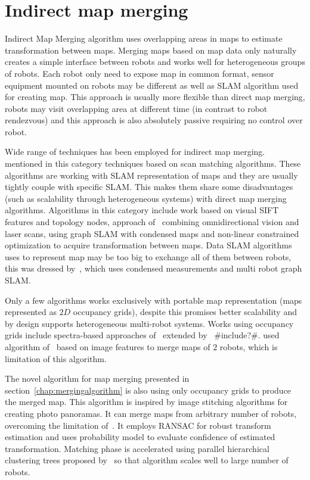 \section{Indirect map merging}

Indirect Map Merging algorithm uses overlapping areas in maps to estimate transformation between maps. Merging maps based on map data only naturally creates a simple interface between robots and works well for heterogeneous groups of robots. Each robot only need to expose map in common format, sensor equipment mounted on robots may be different as well as \gls{SLAM} algorithm used for creating map. This approach is usually more flexible than direct map merging, robots may visit overlapping area at different time (in contrast to robot rendezvous) and this approach is also absolutely passive requiring no control over robot.

Wide range of techniques has been employed for indirect map merging. \cite{Lee2012} mentioned in this category techniques based on scan matching algorithms. These algorithms are working with \gls{SLAM} representation of maps and they are usually tightly couple with specific \gls{SLAM}. This makes them share some disadvantages (such as scalability through heterogeneous systems) with direct map merging algorithms. Algorithms in this category include \cite{Wang2012} work based on visual \gls{SIFT} features and topology nodes, approach of~\cite{Tungandi2010} combining omnidirectional vision and laser scans, \cite{Cunningham2012} using graph \gls{SLAM} with condensed maps and non-linear constrained optimization to acquire transformation between maps. Data \gls{SLAM} algorithms uses to represent map may be too big to exchange all of them between robots, this was dressed by~\cite{Lazaro2013}, which uses condensed measurements and multi robot graph \gls{SLAM}.

Only a few algorithms works exclusively with portable map representation (maps represented as $2D$ occupancy grids), despite this promises better scalability and by design supports heterogeneous multi-robot systems. Works using occupancy grids include spectra-based approaches of~\cite{Carpin2008} extended by~\cite{Lee2011} \#include?\#. \cite{martins2013mrslam} used algorithm of~\cite{MapstitchROS} based on image features to merge maps of $2$ robots, which is limitation of this algorithm.

The novel algorithm for map merging presented in section~\ref{chap:mergingalgorithm} is also using only occupancy grids to produce the merged map. This algorithm is inspired by image stitching algorithms for creating photo panoramas. It can merge maps from arbitrary number of robots, overcoming the limitation of~\cite{MapstitchROS}. It employs \gls{RANSAC} for robust transform estimation and uses probability model to evaluate confidence of estimated transformation. Matching phase is accelerated using parallel hierarchical clustering trees proposed by~\cite{Muja2012} so that algorithm scales well to large number of robots.

